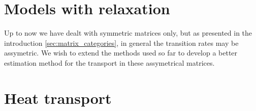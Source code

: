 
\section{Models with relaxation}




Up to now we have dealt with symmetric matrices only, but as presented in 
the introduction \autoref{sec:matrix_categories}, in general the transition 
rates may be assymetric. We wish to extend the methods used so far to
develop a better estimation method for the transport in these assymetrical matrices.






\section{Heat transport}

\begin{comment}
Heat conduction by phonons is also affected by the localization properties
of the model. If disorder scatters normal modes and induces diffusive 
energy transport, followed by normal heat conduction, then in accordance to Fourier's law, 
the heat current $J$ depends inversely on the system size: $J\sim N^{-1}$. 
However, in recent studies \ref{who} it was shown that $J\sim N^{-\alpha}$ 
with $\alpha\ne 1$ is sometimes the case for disordered $1d$ harmonic chains.
We wish to investigate the validity of Fourier's law for quasi-$1d$ and 
higher dimensional disordered systems.
\end{comment}

